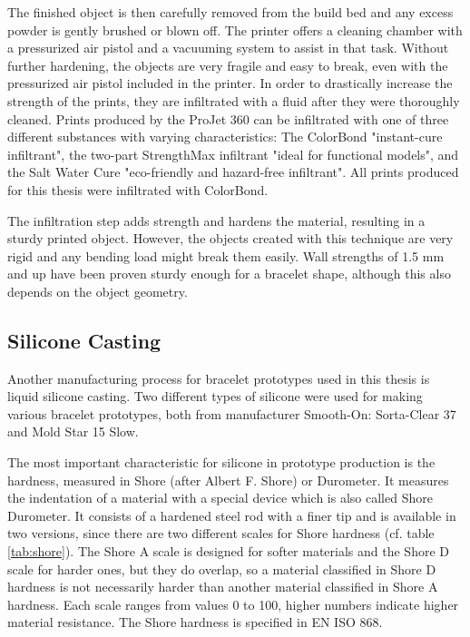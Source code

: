 The finished object is then carefully removed from the build bed and any excess powder is gently brushed or blown off. The printer offers a cleaning chamber with a pressurized air pistol and a vacuuming system to assist in that task. Without further hardening, the objects are very fragile and easy to break, even with the pressurized air pistol included in the printer. In order to drastically increase the strength of the prints, they are infiltrated with a fluid after they were thoroughly cleaned. Prints produced by the ProJet 360 can be infiltrated with one of three different substances with varying characteristics: The ColorBond "instant-cure infiltrant", the two-part StrengthMax infiltrant "ideal for functional models", and the Salt Water Cure "eco-friendly and hazard-free infiltrant"\cite{datasheet_printer}. All prints produced for this thesis were infiltrated with ColorBond.

The infiltration step adds strength and hardens the material, resulting in a sturdy printed object. However, the objects created with this technique are very rigid and any bending load might break them easily. Wall strengths of 1.5 mm and up have been proven sturdy enough for a bracelet shape, although this also depends on the object geometry.

\subsection{Silicone Casting}
Another manufacturing process for bracelet prototypes used in this thesis is liquid silicone casting. Two different types of silicone were used for making various bracelet prototypes, both from manufacturer Smooth-On: Sorta-Clear 37 and Mold Star 15 Slow.

The most important characteristic for silicone in prototype production is the hardness, measured in Shore (after Albert F. Shore) or Durometer. It measures the indentation of a material with a special device which is also called Shore Durometer. It consists of a hardened steel rod with a finer tip and is available in two versions, since there are two different scales for Shore hardness (cf. table \ref{tab:shore}). The Shore A scale is designed for softer materials and the Shore D scale for harder ones, but they do overlap, so a material classified in Shore D hardness is not necessarily harder than another material classified in Shore A hardness. Each scale ranges from values 0 to 100, higher numbers indicate higher material resistance. The Shore hardness is specified in EN ISO 868.

